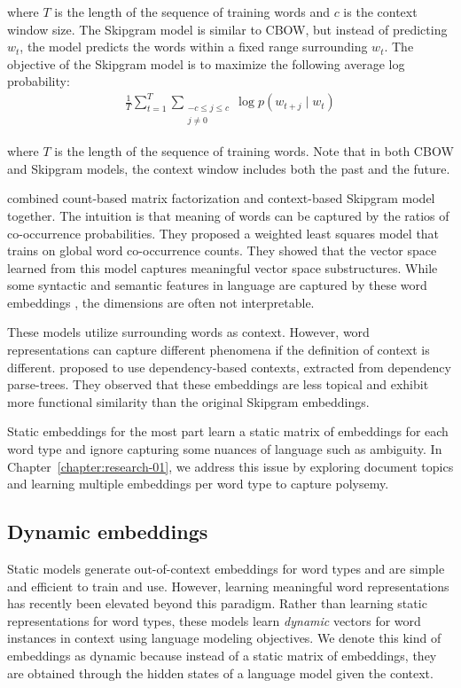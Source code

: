 \noindent where $T$ is the length of the sequence of training words and $c$ is the context window size.
The Skipgram model is similar to CBOW, but instead of predicting $w_t$, the model predicts the words within a fixed range surrounding $w_t$.
The objective of the Skipgram model is to maximize the following average log probability:
\begin{align}
\frac{1}{T} \sum_{t=1}^T \sum_{\substack{-c \le j \le c \\ j \ne 0}} \log p(w_{t+j} \mid w_{t})
\end{align}

\noindent where $T$ is the length of the sequence of training words.
Note that in both CBOW and Skipgram models, the context window includes both the past and the future.

\citet{pennington2014glove} combined count-based matrix factorization and context-based Skipgram model together.
The intuition is that meaning of words can be captured by the ratios of co-occurrence probabilities.
They proposed a weighted least squares model that trains on global word co-occurrence counts. 
They showed that the vector space learned from this model captures meaningful vector space substructures.
While some syntactic and semantic features in language are captured by these word embeddings \citep{mikolov-etal-2013-linguistic}, the dimensions are often not interpretable. 

These models utilize surrounding words as context.
However, word representations can capture different phenomena if the definition of context is different. 
\citet{levy2014dependency} proposed to use dependency-based contexts, extracted from dependency parse-trees. 
They observed that these embeddings are less topical and exhibit more functional similarity than the original Skipgram embeddings.

Static embeddings for the most part learn a static matrix of embeddings for each word type and ignore capturing some nuances of language such as ambiguity. 
In Chapter~\ref{chapter:research-01}, we address this issue by exploring document topics and learning multiple embeddings per word type to capture polysemy. 

\subsection{Dynamic embeddings} 

Static models generate out-of-context embeddings for word types and are simple and efficient to train and use. 
However, learning meaningful word representations has recently been elevated beyond this paradigm. 
Rather than learning static representations for word types, these models learn \textit{dynamic} vectors for word instances in context using language modeling objectives. 
We denote this kind of embeddings as dynamic because instead of a static matrix of embeddings, they are obtained through the hidden states of a language model given the context.

